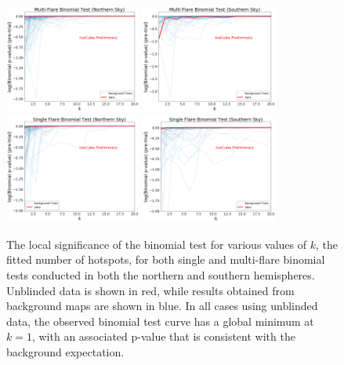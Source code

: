 \begin{figure}[h]
\centering
\includegraphics[width=0.4\textwidth]{figs/bicurve_north.png}
\includegraphics[width=0.4\textwidth]{figs/bicurve_south.png}
\includegraphics[width=0.4\textwidth]{figs/bicurve_sf_north.png}
\includegraphics[width=0.4\textwidth]{figs/bicurve_sf_south.png}
\caption{The local significance of the binomial test for various values of $k$, the fitted number of hotspots, for both single and multi-flare binomial tests conducted in both the northern and southern hemispheres. Unblinded data is shown in red, while results obtained from background maps are shown in blue. In all cases using unblinded data, the observed binomial test curve has a global minimum at $k=1$, with an associated p-value that is consistent with the background expectation.}
\label{fig:bicurves}
\end{figure}

